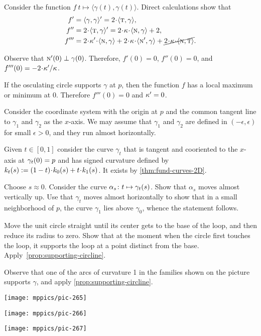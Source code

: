 \begin{multicols}{2}
Consider the function $f\:t\mapsto \langle\gamma(t),\gamma(t)\rangle$.
Direct calculations show that 
\begin{align*}
f'
&=\langle\gamma,\gamma\rangle'
=2\cdot\langle\tan,\gamma\rangle,
\\
f''
&=2\cdot\langle\tan,\gamma\rangle'
=2\cdot\kur\cdot\langle\norm,\gamma\rangle+2,
\\
f'''
&=2\cdot\kur'\cdot\langle\norm,\gamma\rangle
+2\cdot\kur\cdot\langle\norm',\gamma\rangle+\cancel{2\cdot\kur\cdot\langle\norm,\tan\rangle}.
\end{align*}

Observe that $\text{\sc{n}}'(0)\perp\gamma(0)$.
Therefore, $f'(0)=0$, $f''(0)=0$, and $f'''(0)\z=-2\cdot\kur'/\kur$.

If the osculating circle supports $\gamma$ at $p$,
then the function $f$ has a local maximum or minimum at $0$.
Therefore $f'''(0)=0$ and $\kappa'=0$.

Consider the coordinate system with the origin at $p$ and the common tangent line to $\gamma_1$ and $\gamma_2$ as the $x$-axis.
We may assume that $\gamma_1$ and $\gamma_2$ are defined in $(-\epsilon,\epsilon)$ for small $\epsilon>0$,
and they run almost horizontally.

Given $t\in[0,1]$ consider the curve $\gamma_t$ that is tangent and cooriented to the $x$-axis at $\gamma_t(0)\z=p$ and has signed curvature defined by $\skur_t(s)\z\df(1\z-t)\cdot\skur_0(s)+t\cdot\skur_1(s)$.
It exists by \ref{thm:fund-curves-2D}.

Choose $s\approx 0$.
Consider the curve $\alpha_s\:t\z\mapsto \gamma_t(s)$.
Show that $\alpha_s$ moves almost vertically up.
Use that $\gamma_t$ moves almost horizontally to show that in a small neighborhood of $p$, the curve $\gamma_1$ lies above $\gamma_0$,
whence the statement follows.

Move the unit circle straight until its center gets to the base of the loop,
and then reduce its radius to zero.
Show that at the moment when the circle first touches the loop, it supports the loop at a point distinct from the base.
Apply~\ref{prop:supporting-circline}.


Observe that one of the arcs of curvature 1 in the families shown on the picture supports $\gamma$, and apply \ref{prop:supporting-circline}.

\begin{Figure}
\begin{minipage}{.35\textwidth}
\centering
\texttt{[image: mppics/pic-265]}
\end{minipage}
\hfill
\begin{minipage}{.3\textwidth}
\centering
\texttt{[image: mppics/pic-266]}
\end{minipage}
\hfill
\begin{minipage}{.25\textwidth}
\centering
\texttt{[image: mppics/pic-267]}
\end{minipage}
\end{Figure}


\end{multicols}
